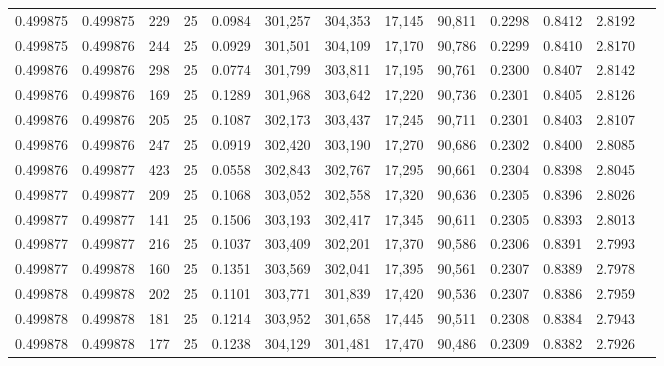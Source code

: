 \begin{tabular}{rrrrrrrrrrrrr}
0.499875 & 0.499875 &   229 &  25 &                                     0.0984 & 301,257 & 304,353 &  17,145 &  90,811 & 0.2298 & 0.8412 & 2.8192 \\
0.499875 & 0.499876 &   244 &  25 &                                     0.0929 & 301,501 & 304,109 &  17,170 &  90,786 & 0.2299 & 0.8410 & 2.8170 \\
0.499876 & 0.499876 &   298 &  25 &                                     0.0774 & 301,799 & 303,811 &  17,195 &  90,761 & 0.2300 & 0.8407 & 2.8142 \\
0.499876 & 0.499876 &   169 &  25 &                                     0.1289 & 301,968 & 303,642 &  17,220 &  90,736 & 0.2301 & 0.8405 & 2.8126 \\
0.499876 & 0.499876 &   205 &  25 &                                     0.1087 & 302,173 & 303,437 &  17,245 &  90,711 & 0.2301 & 0.8403 & 2.8107 \\
0.499876 & 0.499876 &   247 &  25 &                                     0.0919 & 302,420 & 303,190 &  17,270 &  90,686 & 0.2302 & 0.8400 & 2.8085 \\
0.499876 & 0.499877 &   423 &  25 &                                     0.0558 & 302,843 & 302,767 &  17,295 &  90,661 & 0.2304 & 0.8398 & 2.8045 \\
0.499877 & 0.499877 &   209 &  25 &                                     0.1068 & 303,052 & 302,558 &  17,320 &  90,636 & 0.2305 & 0.8396 & 2.8026 \\
0.499877 & 0.499877 &   141 &  25 &                                     0.1506 & 303,193 & 302,417 &  17,345 &  90,611 & 0.2305 & 0.8393 & 2.8013 \\
0.499877 & 0.499877 &   216 &  25 &                                     0.1037 & 303,409 & 302,201 &  17,370 &  90,586 & 0.2306 & 0.8391 & 2.7993 \\
0.499877 & 0.499878 &   160 &  25 &                                     0.1351 & 303,569 & 302,041 &  17,395 &  90,561 & 0.2307 & 0.8389 & 2.7978 \\
0.499878 & 0.499878 &   202 &  25 &                                     0.1101 & 303,771 & 301,839 &  17,420 &  90,536 & 0.2307 & 0.8386 & 2.7959 \\
0.499878 & 0.499878 &   181 &  25 &                                     0.1214 & 303,952 & 301,658 &  17,445 &  90,511 & 0.2308 & 0.8384 & 2.7943 \\
0.499878 & 0.499878 &   177 &  25 &                                     0.1238 & 304,129 & 301,481 &  17,470 &  90,486 & 0.2309 & 0.8382 & 2.7926 \\

\end{tabular}
